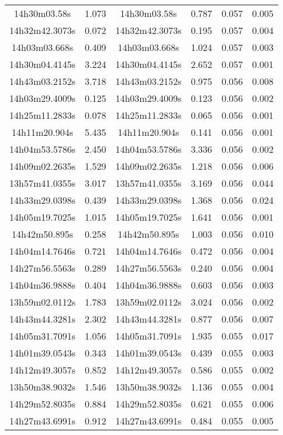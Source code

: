 \begin{table}
\begin{tabular}{cccccc}
14h30m03.58s & 1.073 & 14h30m03.58s & 0.787 & 0.057 & 0.005 \\
14h32m42.3073s & 0.072 & 14h32m42.3073s & 0.195 & 0.057 & 0.004 \\
14h03m03.668s & 0.409 & 14h03m03.668s & 1.024 & 0.057 & 0.003 \\
14h30m04.4145s & 3.224 & 14h30m04.4145s & 2.652 & 0.057 & 0.001 \\
14h43m03.2152s & 3.718 & 14h43m03.2152s & 0.975 & 0.056 & 0.008 \\
14h03m29.4009s & 0.125 & 14h03m29.4009s & 0.123 & 0.056 & 0.002 \\
14h25m11.2833s & 0.078 & 14h25m11.2833s & 0.065 & 0.056 & 0.001 \\
14h11m20.904s & 5.435 & 14h11m20.904s & 0.141 & 0.056 & 0.001 \\
14h04m53.5786s & 2.450 & 14h04m53.5786s & 3.336 & 0.056 & 0.002 \\
14h09m02.2635s & 1.529 & 14h09m02.2635s & 1.218 & 0.056 & 0.006 \\
13h57m41.0355s & 3.017 & 13h57m41.0355s & 3.169 & 0.056 & 0.044 \\
14h33m29.0398s & 0.439 & 14h33m29.0398s & 1.368 & 0.056 & 0.024 \\
14h05m19.7025s & 1.015 & 14h05m19.7025s & 1.641 & 0.056 & 0.001 \\
14h42m50.895s & 0.258 & 14h42m50.895s & 1.003 & 0.056 & 0.010 \\
14h04m14.7646s & 0.721 & 14h04m14.7646s & 0.472 & 0.056 & 0.004 \\
14h27m56.5563s & 0.289 & 14h27m56.5563s & 0.240 & 0.056 & 0.004 \\
14h04m36.9888s & 0.404 & 14h04m36.9888s & 0.603 & 0.056 & 0.003 \\
13h59m02.0112s & 1.783 & 13h59m02.0112s & 3.024 & 0.056 & 0.002 \\
14h43m44.3281s & 2.302 & 14h43m44.3281s & 0.877 & 0.056 & 0.007 \\
14h05m31.7091s & 1.056 & 14h05m31.7091s & 1.935 & 0.055 & 0.017 \\
14h01m39.0543s & 0.343 & 14h01m39.0543s & 0.439 & 0.055 & 0.003 \\
14h12m49.3057s & 0.852 & 14h12m49.3057s & 0.586 & 0.055 & 0.002 \\
13h50m38.9032s & 1.546 & 13h50m38.9032s & 1.136 & 0.055 & 0.004 \\
14h29m52.8035s & 0.884 & 14h29m52.8035s & 0.621 & 0.055 & 0.006 \\
14h27m43.6991s & 0.912 & 14h27m43.6991s & 0.484 & 0.055 & 0.005 \\

\end{tabular}
\end{table}
